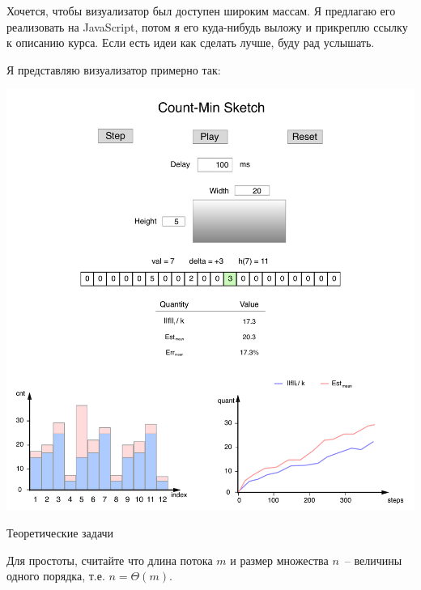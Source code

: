 \documentclass{article}
\begin{document}
Хочется, чтобы визуализатор был доступен широким массам. Я предлагаю его реализовать на JavaScript, потом я его куда-нибудь выложу и прикреплю ссылку к описанию курса. Если есть идеи как сделать лучше, буду рад услышать.

Я представляю визуализатор примерно так:
\begin{center}
\includegraphics[scale=0.25]{cms.pdf}
\end{center}


\pagebreak
\begin{center}
    {\large Теоретические задачи}
\end{center}

Для простоты, считайте что длина потока $m$ и размер множества $n$~-- величины одного порядка, т.е. $n = \Theta(m)$.
\end{document}
